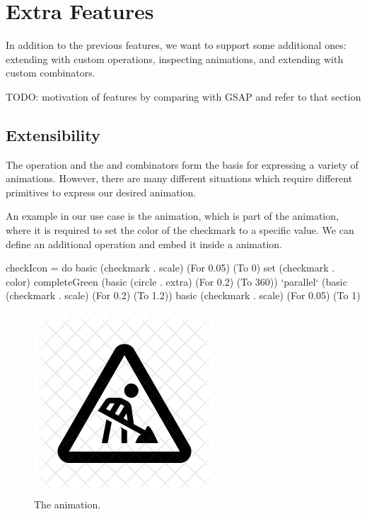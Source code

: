 \section{Extra Features}
\label{sec:features}

In addition to the previous features, we want to support some additional ones: extending with custom operations, inspecting animations, and extending with custom combinators.

TODO: motivation of features by comparing with GSAP and refer to that section

\subsection{Extensibility}
\label{sec:customop}

The  operation and the  and  combinators form the basis for expressing a variety of animations. However, there are many different situations which require different primitives to express our desired animation.

An example in our use case is the  animation, which is part of the  animation, where it is required to set the color of the checkmark to a specific value. We can define an additional  operation and embed it inside a \dsl{} animation.

\begin{spec}
checkIcon = do
  basic (checkmark . scale) (For 0.05) (To 0)
  set (checkmark . color) completeGreen
  (basic (circle . extra) (For 0.2) (To 360))
    `parallel`
    (basic (checkmark . scale) (For 0.2) (To 1.2))
  basic (checkmark . scale) (For 0.05) (To 1)
\end{spec}

\begin{figure}[h]
\centering
\includegraphics[width=\figscale\textwidth]{pictures/todo}
\caption{The  animation.}
\label{fig:}
\end{figure}

